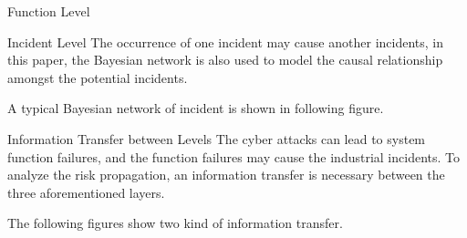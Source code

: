 \begin{frame}{Function Level}
    \label<trans:1>{Hazardous Incident Prediction: Comparison of Fault Tree and Bayesian Network Question}
    \label<trans:2>{Hazardous Incident Prediction: Comparison of Fault Tree and Bayesian Network Answer}
    \begin{overlayarea}{\textwidth}{6cm}
    \begin{center}
      
    \end{center}
    \end{overlayarea}
\end{frame}

\begin{frame}{Incident Level}\label{Hazardous Incident Prediction: Incident Level}
    The occurrence of one incident may cause another incidents, in this paper, the Bayesian network is also used to model the causal relationship amongst the potential incidents.

    A typical Bayesian network of incident is shown in following figure.

    \begin{center}
      
    \end{center}
\end{frame}

\begin{frame}{Information Transfer between Levels}
    \label<trans:1>{Hazardous Incident Prediction: Information Transfer from Attack to Function}
    \label<trans:2>{Hazardous Incident Prediction: Information Transfer from Function to Incident}
    The cyber attacks can lead to system function failures, and the function failures may cause the industrial incidents. To analyze the risk propagation, an information transfer is necessary between the three aforementioned layers.

    The following figures show two kind of information transfer.

    \begin{center}
    \end{center}
\end{frame}

